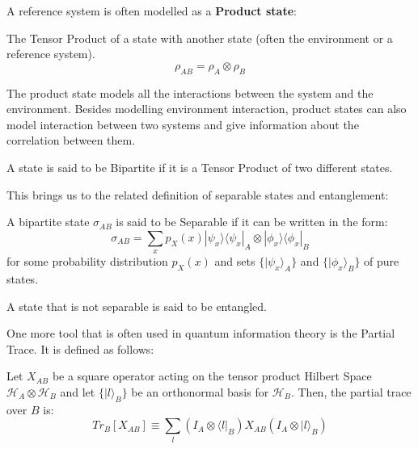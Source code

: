 A reference system is often modelled as a \textbf{Product state}:
\begin{definition}
    The Tensor Product of a state with another state (often the environment or a reference system).
    \begin{equation}
        \rho_{AB} = \rho_A \otimes \rho_B
    \end{equation}
\end{definition}
The product state models all the interactions between the system and the environment. Besides modelling
environment interaction, product states can also model interaction between two systems and give
information about the correlation between them.
\begin{definition}
    A state is said to be Bipartite if it is a Tensor Product of two different states.
\end{definition}

This brings us to the related definition of separable states and entanglement:
\begin{definition}
    A bipartite state $\sigma_{AB}$ is said to be Separable if it can be written in the form:
    \begin{equation}
        \sigma_{AB} = \displaystyle\sum_{x} p_X(x)|\psi_x\rangle\langle\psi_x|_A \otimes |\phi_x\rangle\langle\phi_x|_B
    \end{equation}
    for some probability distribution $p_X(x)$ and sets $\{| \psi_x \rangle_A\}$ and $\{| \phi_x \rangle_B\}$ of pure states.
\end{definition}

\begin{definition}[Entanglement]
    A state that is not separable is said to be entangled.
\end{definition}

One more tool that is often used in quantum information theory is the Partial Trace. It is defined as follows:

\begin{definition}
    Let $X_{AB}$ be a square operator acting on the tensor product Hilbert Space $\mathcal{H}_A\otimes \mathcal{H}_B$
    and let $\{| l \rangle_B\}$ be an orthonormal basis for $\mathcal{H}_B$. Then, the partial trace over $B$ is:
    \begin{equation}
        Tr_B[X_{AB}] \equiv \displaystyle\sum_{l} (I_A \otimes \langle l |_B) X_{AB} (I_A \otimes | l \rangle_B)
    \end{equation}
\end{definition}

